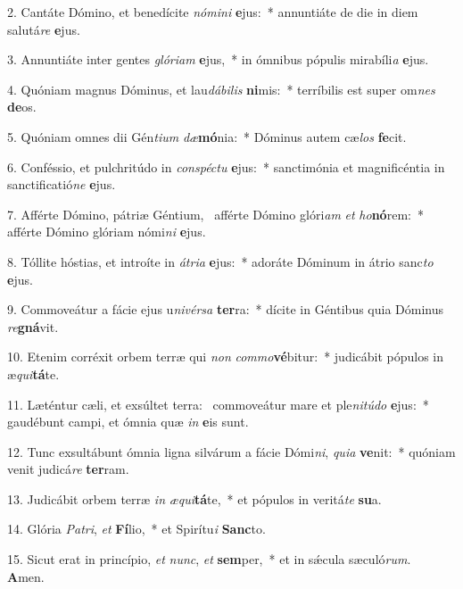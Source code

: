 2. Cantáte Dómino, et benedícite \textit{nó}\textit{mi}\textit{ni} \textbf{e}jus:~*  annuntiáte de die in diem salutá\textit{re} \textbf{e}jus.\

3. Annuntiáte inter gentes \textit{gló}\textit{ri}\textit{am} \textbf{e}jus,~*  in ómnibus pópulis mirabíli\textit{a} \textbf{e}jus.\

4. Quóniam magnus Dóminus, et lau\textit{dá}\textit{bi}\textit{lis} \textbf{ni}mis:~*  terríbilis est super om\textit{nes} \textbf{de}os.\

5. Quóniam omnes dii Gén\textit{ti}\textit{um} \textit{dæ}\textbf{mó}nia:~*  Dóminus autem cæ\textit{los} \textbf{fe}cit.\

6. Conféssio, et pulchritúdo in \textit{con}\textit{spéc}\textit{tu} \textbf{e}jus:~*  sanctimónia et magnificéntia in sanctificatió\textit{ne} \textbf{e}jus.\

7. Afférte Dómino, pátriæ Géntium, \dag\  afférte Dómino glóri\textit{am} \textit{et} \textit{ho}\textbf{nó}rem:~*  afférte Dómino glóriam nómi\textit{ni} \textbf{e}jus.\

8. Tóllite hóstias, et introíte in \textit{á}\textit{tri}\textit{a} \textbf{e}jus:~*  adoráte Dóminum in átrio sanc\textit{to} \textbf{e}jus.\

9. Commoveátur a fácie ejus u\textit{ni}\textit{vér}\textit{sa} \textbf{ter}ra:~*  dícite in Géntibus quia Dóminus \textit{re}\textbf{gná}vit.\

10. Etenim corréxit orbem terræ qui \textit{non} \textit{com}\textit{mo}\textbf{vé}bitur:~*  judicábit pópulos in æ\textit{qui}\textbf{tá}te.\

11. Læténtur cæli, et exsúltet terra: \dag\  commoveátur mare et ple\textit{ni}\textit{tú}\textit{do} \textbf{e}jus:~*  gaudébunt campi, et ómnia quæ \textit{in} \textbf{e}is sunt.\

12. Tunc exsultábunt ómnia ligna silvárum a fácie Dómi\textit{ni}, \textit{qui}\textit{a} \textbf{ve}nit:~*  quóniam venit judicá\textit{re} \textbf{ter}ram.\

13. Judicábit orbem terræ \textit{in} \textit{æ}\textit{qui}\textbf{tá}te,~*  et pópulos in veritá\textit{te} \textbf{su}a.\

14. Glória \textit{Pa}\textit{tri}, \textit{et} \textbf{Fí}lio,~*  et Spirítu\textit{i} \textbf{Sanc}to.\

15. Sicut erat in princípio, \textit{et} \textit{nunc}, \textit{et} \textbf{sem}per,~*  et in sǽcula sæculó\textit{rum}. \textbf{A}men.\

